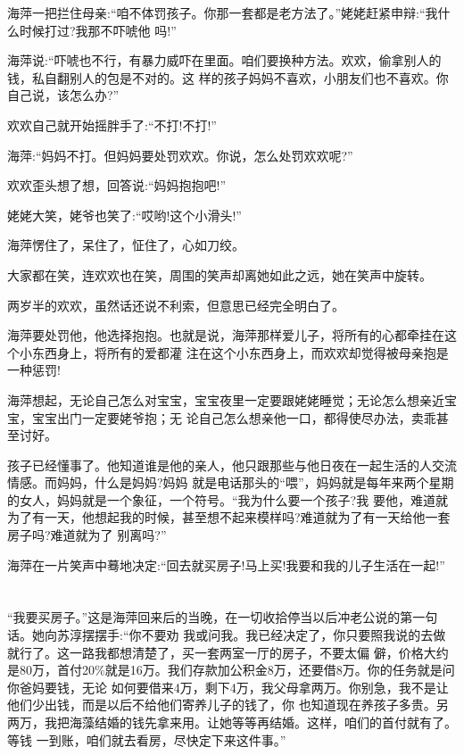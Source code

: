 \documentclass[11pt,a4paper,onecolumn]{article}
\begin{document}
海萍一把拦住母亲:``咱不体罚孩子。你那一套都是老方法了。''姥姥赶紧申辩:``我什么时候打过?我那不吓唬他
吗!''

海萍说:``吓唬也不行，有暴力威吓在里面。咱们要换种方法。欢欢，偷拿别人的钱，私自翻别人的包是不对的。这
样的孩子妈妈不喜欢，小朋友们也不喜欢。你自己说，该怎么办?''

欢欢自己就开始摇胖手了:``不打!不打!''

海萍:``妈妈不打。但妈妈要处罚欢欢。你说，怎么处罚欢欢呢?''

欢欢歪头想了想，回答说:``妈妈抱抱吧!''

姥姥大笑，姥爷也笑了:``哎哟!这个小滑头!''

海萍愣住了，呆住了，怔住了，心如刀绞。

大家都在笑，连欢欢也在笑，周围的笑声却离她如此之远，她在笑声中旋转。

两岁半的欢欢，虽然话还说不利索，但意思已经完全明白了。

海萍要处罚他，他选择抱抱。也就是说，海萍那样爱儿子，将所有的心都牵挂在这个小东西身上，将所有的爱都灌
注在这个小东西身上，而欢欢却觉得被母亲抱是一种惩罚!

海萍想起，无论自己怎么对宝宝，宝宝夜里一定要跟姥姥睡觉；无论怎么想亲近宝宝，宝宝出门一定要姥爷抱；无
论自己怎么想亲他一口，都得使尽办法，卖乖甚至讨好。

孩子已经懂事了。他知道谁是他的亲人，他只跟那些与他日夜在一起生活的人交流情感。而妈妈，什么是妈妈?妈妈
就是电话那头的``喂''，妈妈就是每年来两个星期的女人，妈妈就是一个象征，一个符号。``我为什么要一个孩子?我
要他，难道就为了有一天，他想起我的时候，甚至想不起来模样吗?难道就为了有一天给他一套房子吗?难道就为了
别离吗?''

海萍在一片笑声中蓦地决定:``回去就买房子!马上买!我要和我的儿子生活在一起!''

\section[\thesection]{}

``我要买房子。''这是海萍回来后的当晚，在一切收拾停当以后冲老公说的第一句话。她向苏淳摆摆手:``你不要劝
我或问我。我已经决定了，你只要照我说的去做就行了。这一路我都想清楚了，买一套两室一厅的房子，不要太偏
僻，价格大约是80万，首付20\%就是16万。我们存款加公积金8万，还要借8万。你的任务就是问你爸妈要钱，无论
如何要借来4万，剩下4万，我父母拿两万。你别急，我不是让他们少出钱，而是以后不给他们寄养儿子的钱了，你
也知道现在养孩子多贵。另两万，我把海藻结婚的钱先拿来用。让她等等再结婚。这样，咱们的首付就有了。等钱
一到账，咱们就去看房，尽快定下来这件事。''
\end{document}
